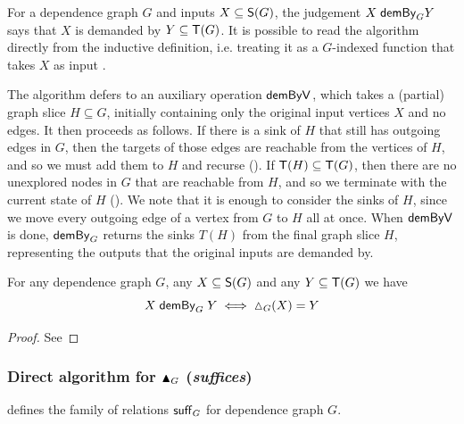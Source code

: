 For a dependence graph $G$ and inputs $X \subseteq \mathsf{S}(G)$, the judgement $X\; \smash{\mathrel{\textup{\textsf{demBy}}_{G}}}
Y$ says that $X$ is demanded by $Y \subseteq \mathsf{T}(G)$. It is possible to read the algorithm directly from
the inductive definition, i.e. treating it as a $G$-indexed function that takes $X$ as input .

The algorithm defers to an auxiliary operation $\mathrel{\textup{\textsf{demByV}}_{}}$, which takes a (partial) graph slice $H
\subseteq G$, initially containing only the original input vertices $X$ and no edges. It then proceeds as
follows. If there is a sink of $H$ that still has outgoing edges in $G$, then the targets of those edges are
reachable from the vertices of $H$, and so we must add them to $H$ and recurse (). If
$\mathsf{T}(H) \subseteq \mathsf{T}(G)$, then there are no unexplored nodes in $G$ that are reachable from $H$, and so
we terminate with the current state of $H$ (). We note that it is enough to consider the sinks
of $H$, since we move every outgoing edge of a vertex from $G$ to $H$ all at once. When $\mathrel{\textup{\textsf{demByV}}_{}}$ is
done, $\mathrel{\textup{\textsf{demBy}}_{G}}$ returns the sinks $T(H)$ from the final graph slice $H$, representing the outputs
that the original inputs are demanded by.

\begin{proposition}
   \label{prop:demandedByAlg-computes-demandedBy}
   For any dependence graph $G$, any $X \subseteq \mathsf{S}(G)$ and any $Y \subseteq \mathsf{T}(G)$ we have
   \[X \demandedByAlg{G} Y \iff \demandedByR_G(X) = Y\]
\end{proposition}
\begin{proof}
   See 
\end{proof}



\subsubsection{Direct algorithm for $\blacktriangle_{G}$ (\emph{suffices})}
\label{sec:conjugate:algorithm:suffices}

\begin{definition}[$\sufficesAlg{G}$]
\label{def:conjugate:algorithm:suffices}
 defines the family of relations $\sufficesAlg{G}$ for dependence graph $G$.
\end{definition}

